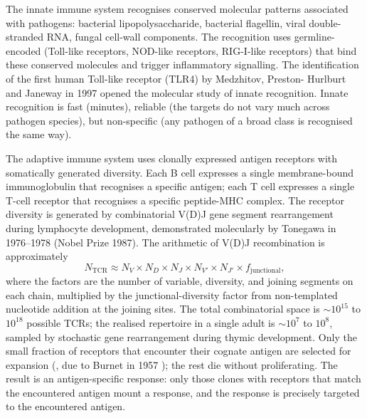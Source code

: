  The innate immune system recognises
conserved molecular patterns associated with pathogens: bacterial
lipopolysaccharide, bacterial flagellin, viral double-stranded RNA,
fungal cell-wall components. The recognition uses germline-encoded
 (Toll-like receptors,
NOD-like receptors, RIG-I-like receptors) that bind these conserved
molecules and trigger inflammatory signalling. The identification of
the first human Toll-like receptor (TLR4) by Medzhitov, Preston-
Hurlburt and Janeway in 1997 \cite{paper:v6c07-medzhitov-1997}
opened the molecular study of innate recognition. Innate recognition
is fast (minutes), reliable (the targets do not vary much across
pathogen species), but non-specific (any pathogen of a broad class is
recognised the same way).

 The adaptive
immune system uses clonally expressed antigen receptors with
somatically generated diversity. Each B cell expresses a single
membrane-bound immunoglobulin that recognises a specific antigen;
each T cell expresses a single T-cell receptor that recognises a
specific peptide-MHC complex. The receptor diversity is generated by
combinatorial V(D)J gene segment rearrangement during lymphocyte
development, demonstrated molecularly by Tonegawa in 1976--1978
\cite{paper:v6c07-tonegawa-1983} (Nobel Prize 1987). The arithmetic
of V(D)J recombination is approximately
\begin{equation}
N_{\text{TCR}} \approx N_V \times N_D \times N_J \times N_{V'} \times N_{J'} \times f_{\text{junctional}},
\label{eq:tcr-diversity}
\end{equation}
where the factors are the number of variable, diversity, and joining
segments on each chain, multiplied by the junctional-diversity factor
from non-templated nucleotide addition at the joining sites. The
total combinatorial space is $\sim 10^{15}$ to $10^{18}$ possible
TCRs; the realised repertoire in a single adult is $\sim 10^7$ to
$10^8$, sampled by stochastic gene rearrangement during thymic
development. Only the small fraction of receptors that encounter
their cognate antigen are selected for expansion (, due to Burnet in 1957
\cite{paper:v6c07-burnet-clonal-1957,text:v6c07-burnet-clonal-book-1959});
the rest die without proliferating. The result is an antigen-specific
response: only those clones with receptors that match the encountered
antigen mount a response, and the response is precisely targeted to
the encountered antigen.

